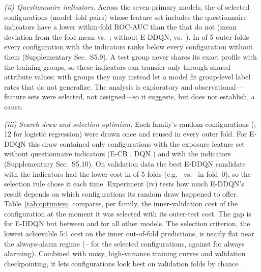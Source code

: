 \emph{(ii) Questionnaire indicators.} Across the seven primary models, the \PHFsProfile{} of \PHFsTotal{} selected configurations (model--fold pairs) whose feature set includes the questionnaire indicators have a lower within-fold ROC-AUC than the \PHFsNoProfile{} that do not (mean deviation from the fold mean \PHFsDevProfile{} vs.\ \PHFsDevNoProfile; without E-DDQN, \PHFsDevProfileExE{} vs.\ \PHFsDevNoProfileExE). In \PHFsFoldsSeparated{} of 5 outer folds every configuration with the indicators ranks below every configuration without them (Supplementary Sec.~S5.9). A test group never shares its exact profile with the training groups, so these indicators can transfer only through shared attribute values; with \nGroupsEval{} groups they may instead let a model fit group-level label rates that do not generalize. The analysis is exploratory and observational---feature sets were selected, not assigned---so it suggests, but does not establish, a cause.

\emph{(iii) Search draw and selection optimism.} Each family's random configurations (\PHDrawTotalEDDQN; 12 for logistic regression) were drawn once and reused in every outer fold. For E-DDQN this draw contained only \PHDrawExposureEDDQN{} configurations with the exposure feature set without questionnaire indicators (E-CB \PHDrawExposureECB, DQN \PHDrawExposureDQN) and \PHDrawQEDDQN{} with the indicators (Supplementary Sec.~S5.10). On validation data the best E-DDQN candidate with the indicators had the lower cost in \PHDrawFoldsQLowerEDDQN{} of 5 folds (e.g.\ \PHDrawFoldZeroQEDDQN{} vs.\ \PHDrawFoldZeroNoQEDDQN{} in fold~0), so the selection rule chose it each time. Experiment (iv) tests how much E-DDQN's result depends on which configurations its random draw happened to offer. Table~\ref{tab:optimism} compares, per family, the inner-validation cost of the configuration at the moment it was selected with its outer-test cost. The gap is \EDDQNOptGap{} for E-DDQN but between \RFOptGap{} and \ECBOptGap{} for all other models. The selection criterion, the lowest achievable 5:1 cost on the inner out-of-fold predictions, is nearly flat near the always-alarm regime (\PHSelCostMin--\PHSelCostMax{} for the selected configurations, against \AlwaysCost{} for always alarming). Combined with noisy, high-variance training curves and validation checkpointing, it lets configurations look best on validation folds by chance~\cite{varma2006bias}.

